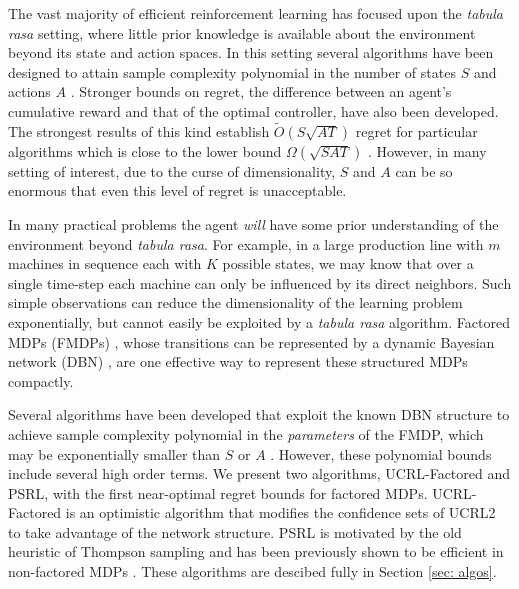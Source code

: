\documentclass{article}
\begin{document}
The vast majority of efficient reinforcement learning has focused upon the {\it tabula rasa} setting, where little prior knowledge is available about the environment beyond its state and action spaces.
In this setting several algorithms have been designed to attain sample complexity polynomial in the number of states $S$ and actions $A$ \cite{kearns2002near, brafman2003r}.
Stronger bounds on regret, the difference between an agent's cumulative reward and that of the optimal controller, have also been developed.
The strongest results of this kind establish $\tilde{O}(S\sqrt{AT})$ regret for particular algorithms \cite{jaksch2010near,bartlett2009regal,osband2013more} which is close to the lower bound $\Omega(\sqrt{SAT})$ \cite{jaksch2010near}.
However, in many setting of interest, due to the curse of dimensionality, $S$ and $A$ can be so enormous that even this level of regret is unacceptable.

In many practical problems the agent \emph{will} have some prior understanding of the environment beyond {\it tabula rasa}.
For example, in a large production line with $m$ machines in sequence each with $K$ possible states, we may know that over a single time-step each machine can only be influenced by its direct neighbors.
Such simple observations can reduce the dimensionality of the learning problem exponentially, but cannot easily be exploited by a {\it tabula rasa} algorithm.
Factored MDPs (FMDPs) \cite{boutilier2000stochastic}, whose transitions can be represented by a dynamic Bayesian network (DBN) \cite{ghahramani1998learning}, are one effective way to represent these structured MDPs compactly.

Several algorithms have been developed that exploit the known DBN structure to achieve sample complexity polynomial in the \emph{parameters} of the FMDP, which may be exponentially smaller than $S$ or $A$ \cite{strehl2007model,kearns1999efficient,szita2009optimistic}.
However, these polynomial bounds include several high order terms.
We present two algorithms, UCRL-Factored and PSRL, with the first near-optimal regret bounds for factored MDPs.
UCRL-Factored is an optimistic algorithm that modifies the confidence sets of UCRL2 \cite{jaksch2010near} to take advantage of the network structure.
PSRL is motivated by the old heuristic of Thompson sampling \cite{thompson1933} and has been previously shown to be efficient in non-factored MDPs \cite{strens2000bayesian,osband2013more}.
These algorithms are descibed fully in Section \ref{sec: algos}.
\end{document}
